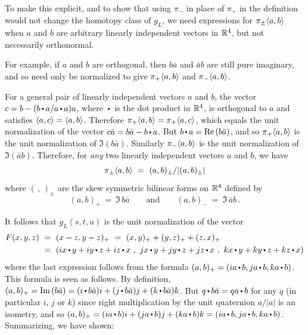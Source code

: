 To make this explicit, and to show that using $\pi_-$ in place of $\pi_+$ in the definition would not change the homotopy class of $g_L$, we need expressions for $\pi_\pm\langle a,b\rangle$ when $a$ and $b$ are arbitrary linearly independent vectors in $\mathbb R^4$, but not necessarily orthonormal.  

For example, if $a$ and $b$ are orthogonal, then $b\bar a$ and $\bar ab$ are still pure imaginary, and so need only be normalized to give  $\pi_+\langle a,b\rangle$ and $\pi_-\langle a,b\rangle$.   

For a general pair of linearly independent vectors $a$ and $b$, the vector $c = b-(b\dt a/a\dt a)a$, where $\dt$ is the dot product in $\mathbb R^4$, is orthogonal to $a$ and satisfies $\langle a,c\rangle = \langle a,b\rangle$.  Therefore $\pi_+\langle a,b\rangle = \pi_+\langle a,c\rangle$, which equals the unit normalization of the vector $c\bar a = b\bar a - b\dt a$.  But $b\dt a = \re(b\bar a)$, and so $\pi_+\langle a,b\rangle$ is the unit normalization of $\Im(b\bar a)$.  Similarly $\pi_-\langle a,b\rangle$ is the unit normalization of $\Im(\bar ab)$.  Therefore, for {\it any} two linearly independent vectors $a$ and $b$, we have  
$$
\pi_\pm\langle a,b\rangle \ = \ (a,b)_\pm / |(a,b)_\pm|  
$$
where $(\,,\,)_\pm$ are the skew symmetric bilinear forms on $\mathbb R^4$ defined by 
$$
(a,b)_+ \ = \ \Im\,b\bar a \qquad\text{and}\qquad (a,b)_- \ = \ \Im\,\bar ab\,.
$$

It follows that $g_L(s,t,u)$ is the unit normalization of the vector
$$
\begin{aligned}
F(x,y,z) \ &= \ (x-z,y-z)_+ \ = \ (x,y)_+ + (y,z)_+ + (z,x)_+ \\
&= \ (ix\dt y + iy\dt z + iz\dt x \ , \  jx\dt y + jy\dt z + jz\dt x \ , \  kx\dt y + ky\dt z + kz\dt x)
\end{aligned}
$$
where the last expression follows from the formula $(a,b)_+ = (ia\dt b, ja\dt b, ka\dt b)$.  This formula is seen as follows.  By definition, $(a,b)_+ = \Im(b\bar a)  =  (i\dt b\bar a)i + (j\dt b\bar a)j + (k\dt b\bar a)k$.  But $q\dt b\bar a = qa\dt b$ for any $q$ (in particular $i$, $j$ or $k$) since right multiplication by the unit quaternion $a/|a|$ is an isometry, and so $(a,b)_+ = (ia\dt b)i + (ja\dt b)j + (ka\dt b)k = (ia\dt b, ja\dt b, ka\dt b)$.
Summarizing, we have shown:
 
